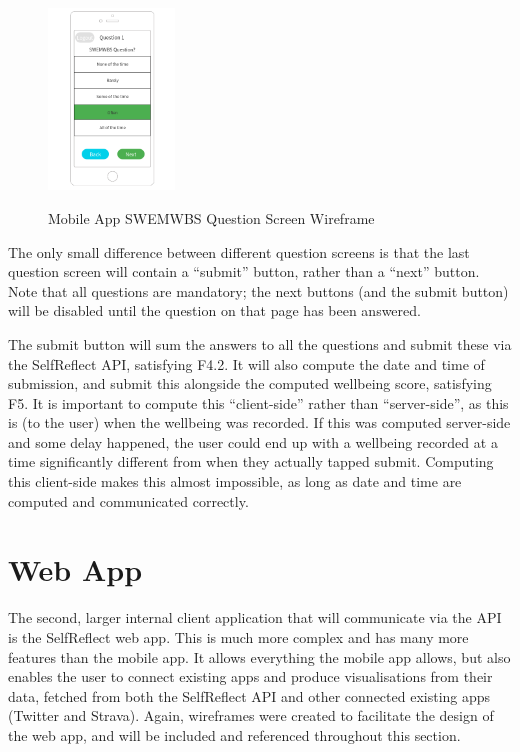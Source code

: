 \documentclass[11pt,openright,a4paper]{report}
\begin{document}
\begin{figure}[ht]
\centering
\caption{Mobile App SWEMWBS Question Screen Wireframe}
\includegraphics[width=0.3\textwidth]{i/mobilequestion.png}
\label{fig:mobilequestion}
\end{figure}

The only small difference between different question screens is that the last question screen will contain a \enquote{submit} button, rather than a \enquote{next} button. Note that all questions are mandatory; the next buttons (and the submit button) will be disabled until the question on that page has been answered.

The submit button will sum the answers to all the questions and submit these via the SelfReflect API, satisfying F4.2. It will also compute the date and time of submission, and submit this alongside the computed wellbeing score, satisfying F5. It is important to compute this \enquote{client-side} rather than \enquote{server-side}, as this is (to the user) when the wellbeing was recorded. If this was computed server-side and some delay happened, the user could end up with a wellbeing recorded at a time significantly different from when they actually tapped submit. Computing this client-side makes this almost impossible, as long as date and time are computed and communicated correctly.

\section{Web App} \label{sec:webappdesign}
The second, larger internal client application that will communicate via the API is the SelfReflect web app. This is much more complex and has many more features than the mobile app. It allows everything the mobile app allows, but also enables the user to connect existing apps and produce visualisations from their data, fetched from both the SelfReflect API and other connected existing apps (Twitter and Strava). Again, wireframes were created to facilitate the design of the web app, and will be included and referenced throughout this section.
\end{document}
